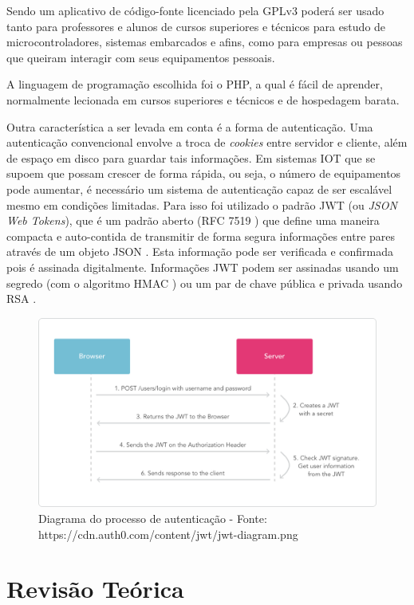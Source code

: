 Sendo um aplicativo de código-fonte licenciado pela GPLv3 poderá ser
usado tanto para professores e alunos de cursos superiores e técnicos
para estudo de microcontroladores, sistemas embarcados e afins, como
para empresas ou pessoas que queiram interagir com seus equipamentos
pessoais.

A linguagem de programação escolhida foi o PHP, a qual é fácil de
aprender, normalmente lecionada em cursos superiores e técnicos e de
hospedagem barata.

Outra característica a ser levada em conta é a forma de autenticação.
Uma autenticação convencional envolve a troca de \emph{cookies} entre
servidor e cliente, além de espaço em disco para guardar tais
informações. Em sistemas IOT que se supoem que possam crescer de forma
rápida, ou seja, o número de equipamentos pode aumentar, é necessário um
sistema de autenticação capaz de ser escalável mesmo em condições
limitadas. Para isso foi utilizado o padrão JWT (ou \emph{JSON Web
Tokens}), que é um padrão aberto (RFC 7519 \cite{rfc7519-2015}) que
define uma maneira compacta e auto-contida de transmitir de forma segura
informações entre pares através de um objeto JSON \cite{jwt-2016}. Esta
informação pode ser verificada e confirmada pois é assinada
digitalmente. Informações JWT podem ser assinadas usando um segredo (com
o algoritmo HMAC \cite{rfc2104-1997}) ou um par de chave pública e
privada usando RSA \cite{rfc3447-2003}.

\begin{figure}[h]
    \includegraphics[scale=0.3]{img/jwt-diagram.png}
    \caption{Diagrama do processo de autenticação - Fonte: https://cdn.auth0.com/content/jwt/jwt-diagram.png}
\end{figure}

\section{Revisão Teórica}\label{revisuxe3o-teuxf3rica}

